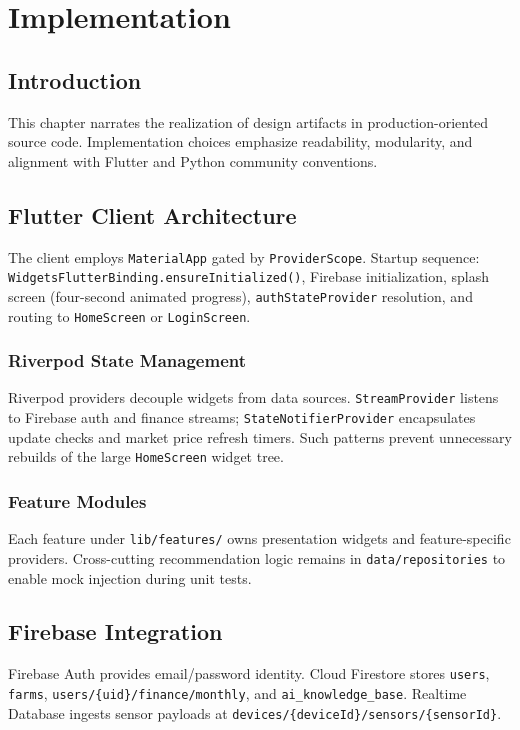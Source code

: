 \chapter{Implementation}
\label{ch:implementation}

\section{Introduction}
This chapter narrates the realization of design artifacts in production-oriented source code. Implementation choices emphasize readability, modularity, and alignment with Flutter and Python community conventions.

\section{Flutter Client Architecture}
The client employs \texttt{MaterialApp} gated by \texttt{ProviderScope}. Startup sequence: \texttt{WidgetsFlutterBinding.ensureInitialized()}, Firebase initialization, splash screen (four-second animated progress), \texttt{authStateProvider} resolution, and routing to \texttt{HomeScreen} or \texttt{LoginScreen}.

\subsection{Riverpod State Management}
Riverpod providers decouple widgets from data sources. \texttt{StreamProvider} listens to Firebase auth and finance streams; \texttt{StateNotifierProvider} encapsulates update checks and market price refresh timers. Such patterns prevent unnecessary rebuilds of the large \texttt{HomeScreen} widget tree.

\subsection{Feature Modules}
Each feature under \texttt{lib/features/} owns presentation widgets and feature-specific providers. Cross-cutting recommendation logic remains in \texttt{data/repositories} to enable mock injection during unit tests.

\section{Firebase Integration}
Firebase Auth provides email/password identity. Cloud Firestore stores \texttt{users}, \texttt{farms}, \texttt{users/\{uid\}/finance/monthly}, and \texttt{ai\_knowledge\_base}. Realtime Database ingests sensor payloads at \texttt{devices/\{deviceId\}/sensors/\{sensorId\}}.

